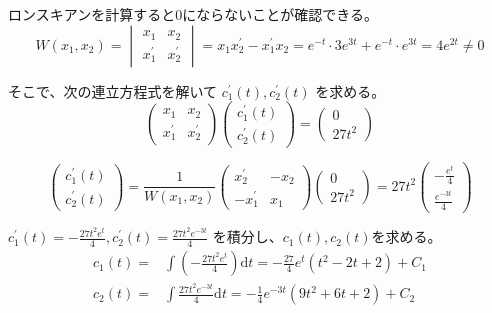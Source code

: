 \documentclass[12pt,b5paper]{ltjsarticle}
\begin{document}
ロンスキアンを計算すると0にならないことが確認できる。
\begin{equation}
 W(x_1,x_2)=
  \begin{vmatrix}
   x_1 & x_2\\
   x_1^{\prime} & x_2^{\prime}
  \end{vmatrix}
  =x_1x_2^{\prime} - x_1^{\prime}x_2
  =e^{-t} \cdot 3e^{3t} + e^{-t} \cdot e^{3t}
  =4e^{2t} \ne 0
\end{equation}

そこで、次の連立方程式を解いて
$c_1^{\prime}(t), c_2^{\prime}(t)$
を求める。
\begin{equation}
 \begin{pmatrix}
   x_1 & x_2\\
   x_1^{\prime} & x_2^{\prime}
 \end{pmatrix}
 \begin{pmatrix}
  c_1^{\prime}(t) \\ c_2^{\prime}(t)
 \end{pmatrix}
 =
 \begin{pmatrix}
  0 \\ 27t^2
 \end{pmatrix}
\end{equation}

\begin{equation}
 \begin{pmatrix}
  c_1^{\prime}(t) \\ c_2^{\prime}(t)
 \end{pmatrix}
 =
 \frac{1}{W(x_1,x_2)}
 \begin{pmatrix}
   x_2^{\prime} & -x_2\\
   -x_1^{\prime} & x_1
 \end{pmatrix}
 \begin{pmatrix}
  0 \\ 27t^2
 \end{pmatrix}
 =
 27t^2
 \begin{pmatrix}
  -\frac{e^{t}}{4} \\ \frac{e^{-3t}}{4}
 \end{pmatrix}
\end{equation}

$c_1^{\prime}(t) = -\frac{27t^2e^{t}}{4} , c_2^{\prime}(t)=\frac{27t^2e^{-3t}}{4}$
を積分し、$c_1(t),c_2(t)$を求める。
\begin{align}
 c_1(t) =& \int \left(-\frac{27t^2e^{t}}{4}\right)\mathrm{d}t
 = -\frac{27}{4}e^{t} (t^{2} - 2t + 2) + C_1\\
 c_2(t) =& \int \frac{27t^2e^{-3t}}{4}\mathrm{d}t
 =
 -\frac{1}{4}e^{-3t} (9t^{2} + 6t + 2) +C_2
\end{align}
\end{document}
